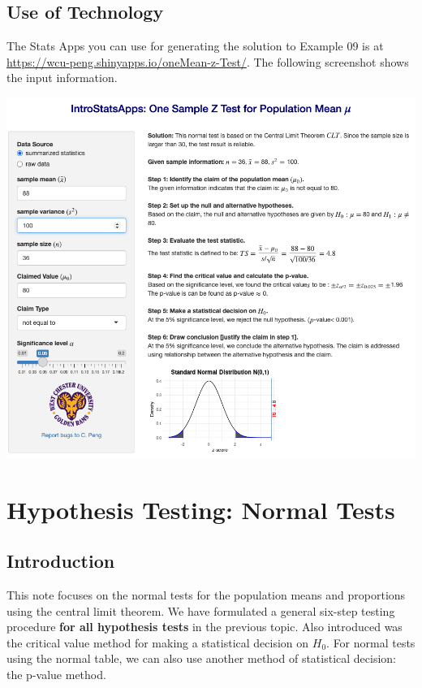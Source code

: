 \documentclass[
]{book}
\begin{document}
\hypertarget{use-of-technology-6}{%
\section{Use of Technology}\label{use-of-technology-6}}

The Stats Apps you can use for generating the solution to Example 09 is at \url{https://wcu-peng.shinyapps.io/oneMean-z-Test/}. The following screenshot shows the input information.

\begin{center}\includegraphics[width=1\linewidth]{week08/useTechnology} \end{center}

\hypertarget{hypothesis-testing-normal-tests}{%
\chapter{Hypothesis Testing: Normal Tests}\label{hypothesis-testing-normal-tests}}

\hypertarget{introduction-1}{%
\section{Introduction}\label{introduction-1}}

This note focuses on the normal tests for the population means and proportions using the central limit theorem. We have formulated a general six-step testing procedure \textbf{for all hypothesis tests} in the previous topic. Also introduced was the critical value method for making a statistical decision on \(H_0\). For normal tests using the normal table, we can also use another method of statistical decision: the p-value method.
\end{document}
